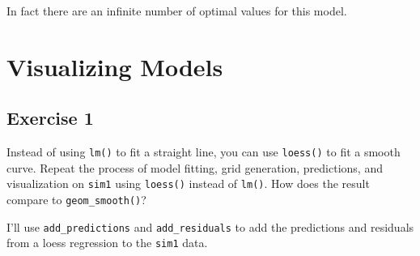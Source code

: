 \documentclass[]{book}
\newenvironment{Shaded}{\begin{snugshade}}{\end{snugshade}}
\newcommand{\CommentTok}[1]{\textcolor[rgb]{0.56,0.35,0.01}{\textit{#1}}}
\newcommand{\DataTypeTok}[1]{\textcolor[rgb]{0.13,0.29,0.53}{#1}}
\newcommand{\DecValTok}[1]{\textcolor[rgb]{0.00,0.00,0.81}{#1}}
\newcommand{\KeywordTok}[1]{\textcolor[rgb]{0.13,0.29,0.53}{\textbf{#1}}}
\newcommand{\NormalTok}[1]{#1}
\newcommand{\OperatorTok}[1]{\textcolor[rgb]{0.81,0.36,0.00}{\textbf{#1}}}
\newcommand{\StringTok}[1]{\textcolor[rgb]{0.31,0.60,0.02}{#1}}
\theoremstyle{definition}
\theoremstyle{definition}
\theoremstyle{definition}
\theoremstyle{remark}
\begin{document}
\begin{Shaded}
\end{Shaded}

\begin{Shaded}
\end{Shaded}

In fact there are an infinite number of optimal values for this model.

\hypertarget{visualizing-models}{%
\section{Visualizing Models}\label{visualizing-models}}

\hypertarget{exercise-1-58}{%
\subsection{Exercise 1}\label{exercise-1-58}}

Instead of using \texttt{lm()} to fit a straight line, you can use
\texttt{loess()} to fit a smooth curve. Repeat the process of model
fitting, grid generation, predictions, and visualization on
\texttt{sim1} using \texttt{loess()} instead of \texttt{lm()}. How does
the result compare to \texttt{geom\_smooth()}?

I'll use \texttt{add\_predictions} and \texttt{add\_residuals} to add
the predictions and residuals from a loess regression to the
\texttt{sim1} data.
\end{document}
